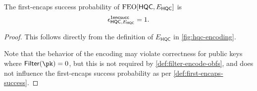 \begin{lemma}
\label{lem:hqc-first-encaps-success}
    The first-encaps success probability of $\textsf{\textnormal{FEO}}[\mathsf{HQC}, E_\mathsf{HQC}]$ is
    \[ \epsilon^{\mathsf{1encsucc}}_{\mathsf{HQC}, E_\mathsf{HQC}} = 1. \]
\end{lemma}
\begin{proof}
    This follows directly from the definition of $E_\mathsf{HQC}$ in \cref{fig:hqc-encoding}.

    Note that the behavior of the encoding may violate correctness for public keys where $\mathsf{Filter}(\pk) = 0$, but this is not required by \cref{def:filter-encode-obfs}, and does not influence the first-encaps success probability as per \cref{def:first-encaps-success}.
\end{proof}

